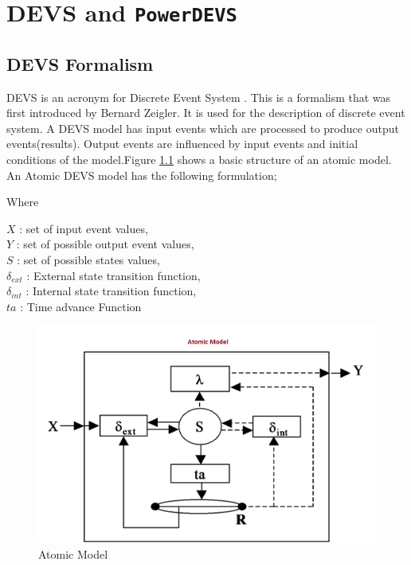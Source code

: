 \documentclass[titlepage]{report}%
\newcommand{\pd}{\texttt{PowerDEVS}~}
\begin{document}
\chapter{DEVS and \pd}

\section{DEVS Formalism}
DEVS is an acronym for Discrete Event System . This is a formalism that was first introduced by Bernard Zeigler. It is used for the description of discrete event system.  A DEVS model has input events which are processed to produce output events(results). Output events are influenced by  input events and  initial conditions of the model.Figure \ref{atomic_model} shows a basic structure of an atomic model.  An Atomic DEVS model has the following formulation;

Where

$X$ 		: set of input event values, \\
$Y$ 		: set of possible output event values, \\
$S$ 		: set of possible states values, \\
$\delta_{ext}$ 	: External state transition function, \\
$\delta_{int}$ 	: Internal state transition function, \\
$ta$	  	: Time advance  Function \\

\begin{figure}[ht!]
  \centering
    \includegraphics[width=1\textwidth]{Fig1.png}
    \caption{Atomic Model}
    \label{atomic_model}
\end{figure}
\end{document}
